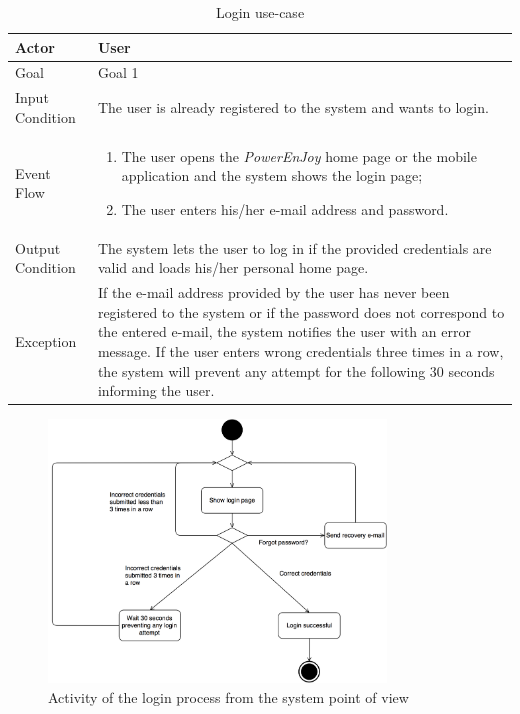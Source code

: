\begin{table}[H]
\begin{center}
\begin{tabular}{p{} | p{}}
\hline
Actor & User\\
\hline
Goal & Goal 1\\
\hline
Input Condition & The user is already registered to the system and wants to login.\\
\hline
Event Flow & 
\begin{enumerate}
\item The user opens the \emph{PowerEnJoy} home page or the mobile application and the system shows the login page;
\item The user enters his/her e-mail address and password.
\end{enumerate} \\
\hline
Output Condition & The system lets the user to log in if the provided credentials are valid and loads his/her personal home page.\\
\hline
Exception & 
If the e-mail address provided by the user has never been registered to the system or if the password does not correspond to the entered e-mail, the system notifies the user with an error message. If the user enters wrong credentials three times in a row, the system will prevent any attempt for the following 30 seconds informing the user.\\
\hline
\end{tabular}
\end{center}
\caption{Login use-case}
\label{login_uc}
\end{table}

\begin{figure}[H]
\begin{center}
		\includegraphics[width=0.8\textwidth]{./specific_requirements/features/diagrams/login_activity.png}
		\caption{Activity of the login process from the system point of view}
		\label{login_act}
\end{center}
\end{figure}

